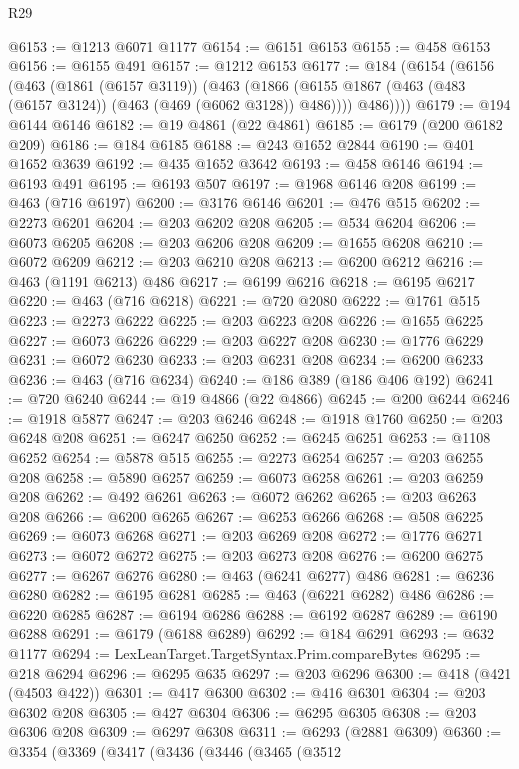 \begin{lexlean}{R29}
\begin{coremodule}
@6153 := @1213 @6071 @1177
@6154 := @6151 @6153
@6155 := @458 @6153
@6156 := @6155 @491
@6157 := @1212 @6153
@6177 := @184
    (@6154
      (@6156
        (@463
          (@1861 (@6157 @3119))
          (@463
            (@1866 (@6155 @1867 (@463 (@483 (@6157 @3124)) (@463 (@469 (@6062 @3128)) @486))))
            @486))))
@6179 := @194 @6144 @6146
@6182 := @19 @4861 (@22 @4861)
@6185 := @6179 (@200 @6182 @209)
@6186 := @184 @6185
@6188 := @243 @1652 @2844
@6190 := @401 @1652 @3639
@6192 := @435 @1652 @3642
@6193 := @458 @6146
@6194 := @6193 @491
@6195 := @6193 @507
@6197 := @1968 @6146 @208
@6199 := @463 (@716 @6197)
@6200 := @3176 @6146
@6201 := @476 @515
@6202 := @2273 @6201
@6204 := @203 @6202 @208
@6205 := @534 @6204
@6206 := @6073 @6205
@6208 := @203 @6206 @208
@6209 := @1655 @6208
@6210 := @6072 @6209
@6212 := @203 @6210 @208
@6213 := @6200 @6212
@6216 := @463 (@1191 @6213) @486
@6217 := @6199 @6216
@6218 := @6195 @6217
@6220 := @463 (@716 @6218)
@6221 := @720 @2080
@6222 := @1761 @515
@6223 := @2273 @6222
@6225 := @203 @6223 @208
@6226 := @1655 @6225
@6227 := @6073 @6226
@6229 := @203 @6227 @208
@6230 := @1776 @6229
@6231 := @6072 @6230
@6233 := @203 @6231 @208
@6234 := @6200 @6233
@6236 := @463 (@716 @6234)
@6240 := @186 @389 (@186 @406 @192)
@6241 := @720 @6240
@6244 := @19 @4866 (@22 @4866)
@6245 := @200 @6244
@6246 := @1918 @5877
@6247 := @203 @6246
@6248 := @1918 @1760
@6250 := @203 @6248 @208
@6251 := @6247 @6250
@6252 := @6245 @6251
@6253 := @1108 @6252
@6254 := @5878 @515
@6255 := @2273 @6254
@6257 := @203 @6255 @208
@6258 := @5890 @6257
@6259 := @6073 @6258
@6261 := @203 @6259 @208
@6262 := @492 @6261
@6263 := @6072 @6262
@6265 := @203 @6263 @208
@6266 := @6200 @6265
@6267 := @6253 @6266
@6268 := @508 @6225
@6269 := @6073 @6268
@6271 := @203 @6269 @208
@6272 := @1776 @6271
@6273 := @6072 @6272
@6275 := @203 @6273 @208
@6276 := @6200 @6275
@6277 := @6267 @6276
@6280 := @463 (@6241 @6277) @486
@6281 := @6236 @6280
@6282 := @6195 @6281
@6285 := @463 (@6221 @6282) @486
@6286 := @6220 @6285
@6287 := @6194 @6286
@6288 := @6192 @6287
@6289 := @6190 @6288
@6291 := @6179 (@6188 @6289)
@6292 := @184 @6291
@6293 := @632 @1177
@6294 := LexLeanTarget.TargetSyntax.Prim.compareBytes
@6295 := @218 @6294
@6296 := @6295 @635
@6297 := @203 @6296
@6300 := @418 (@421 (@4503 @422))
@6301 := @417 @6300
@6302 := @416 @6301
@6304 := @203 @6302 @208
@6305 := @427 @6304
@6306 := @6295 @6305
@6308 := @203 @6306 @208
@6309 := @6297 @6308
@6311 := @6293 (@2881 @6309)
@6360 := @3354
    (@3369
      (@3417
        (@3436
          (@3446
            (@3465
              (@3512

\end{coremodule}
\end{lexlean}
